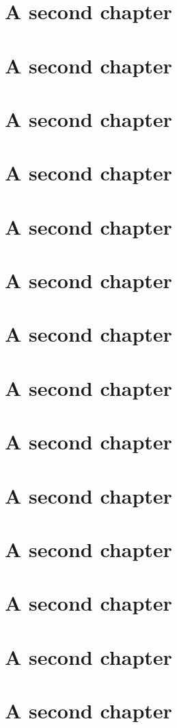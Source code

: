 \documentclass{memoir}
\begin{document}
\lipsum

\chapter{A second chapter}
\chapter{A second chapter}
\chapter{A second chapter}
\chapter{A second chapter}
\chapter{A second chapter}
\chapter{A second chapter}
\chapter{A second chapter}
\chapter{A second chapter}
\chapter{A second chapter}
\chapter{A second chapter}
\chapter{A second chapter}
\chapter{A second chapter}
\chapter{A second chapter}
\chapter{A second chapter}
\end{document}
